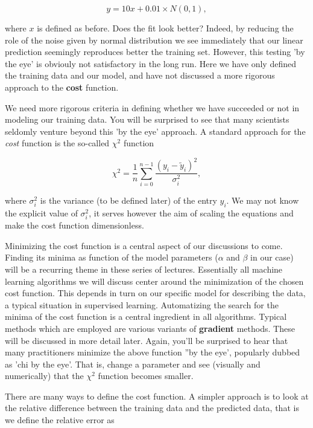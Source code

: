 \documentclass[%
oneside,                 %
final,                   %
10pt]{article}
\begin{document}
\[
y = 10x+0.01 \times N(0,1),
\]

where $x$ is defined as before.  Does the fit look better? Indeed, by
reducing the role of the noise given by normal distribution we see immediately that
our linear prediction seemingly reproduces better the training
set. However, this testing 'by the eye' is obviouly not satisfactory in the
long run. Here we have only defined the training data and our model, and 
have not discussed a more rigorous approach to the \textbf{cost} function.

We need more rigorous criteria in defining whether we have succeeded or
not in modeling our training data.  You will be surprised to see that
many scientists seldomly venture beyond this 'by the eye' approach. A
standard approach for the \emph{cost} function is the so-called $\chi^2$
function 

\[ \chi^2 = \frac{1}{n}
\sum_{i=0}^{n-1}\frac{(y_i-\tilde{y}_i)^2}{\sigma_i^2}, 
\] 

where $\sigma_i^2$ is the variance (to be defined later) of the entry
$y_i$.  We may not know the explicit value of $\sigma_i^2$, it serves
however the aim of scaling the equations and make the cost function
dimensionless.  

Minimizing the cost function is a central aspect of
our discussions to come. Finding its minima as function of the model
parameters ($\alpha$ and $\beta$ in our case) will be a recurring
theme in these series of lectures. Essentially all machine learning
algorithms we will discuss center around the minimization of the
chosen cost function. This depends in turn on our specific
model for describing the data, a typical situation in supervised
learning. Automatizing the search for the minima of the cost function is a
central ingredient in all algorithms. Typical methods which are
employed are various variants of \textbf{gradient} methods. These will be
discussed in more detail later. Again, you'll be surprised to hear that
many practitioners minimize the above function ''by the eye', popularly dubbed as 
'chi by the eye'. That is, change a parameter and see (visually and numerically) that 
the  $\chi^2$ function becomes smaller. 

There are many ways to define the cost function. A simpler approach is to look at the relative difference between the training data and the predicted data, that is we define 
the relative error as
\end{document}
